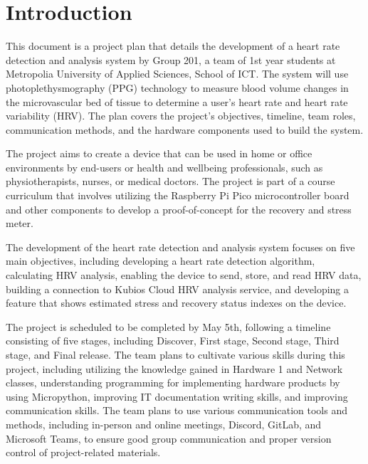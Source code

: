 \documentclass{article}
\begin{document}
\newpage

\tableofcontents

\newpage

\section{Introduction}

This document is a project plan that details the development of a heart rate detection and analysis system by Group 201, a team of 1st year students at Metropolia University of Applied Sciences, School of ICT. The system will use photoplethysmography (PPG) technology to measure blood volume changes in the microvascular bed of tissue to determine a user's heart rate and heart rate variability (HRV). The plan covers the project's objectives, timeline, team roles, communication methods, and the hardware components used to build the system.



The project aims to create a device that can be used in home or office environments by end-users or health and wellbeing professionals, such as physiotherapists, nurses, or medical doctors. The project is part of a course curriculum that involves utilizing the Raspberry Pi Pico microcontroller board and other components to develop a proof-of-concept for the recovery and stress meter.



The development of the heart rate detection and analysis system focuses on five main objectives, including developing a heart rate detection algorithm, calculating HRV analysis, enabling the device to send, store, and read HRV data, building a connection to Kubios Cloud HRV analysis service, and developing a feature that shows estimated stress and recovery status indexes on the device.



The project is scheduled to be completed by May 5th, following a timeline consisting of five stages, including Discover, First stage, Second stage, Third stage, and Final release. The team plans to cultivate various skills during this project, including utilizing the knowledge gained in Hardware 1 and Network classes, understanding programming for implementing hardware products by using Micropython, improving IT documentation writing skills, and improving communication skills. The team plans to use various communication tools and methods, including in-person and online meetings, Discord, GitLab, and Microsoft Teams, to ensure good group communication and proper version control of project-related materials.
\end{document}
